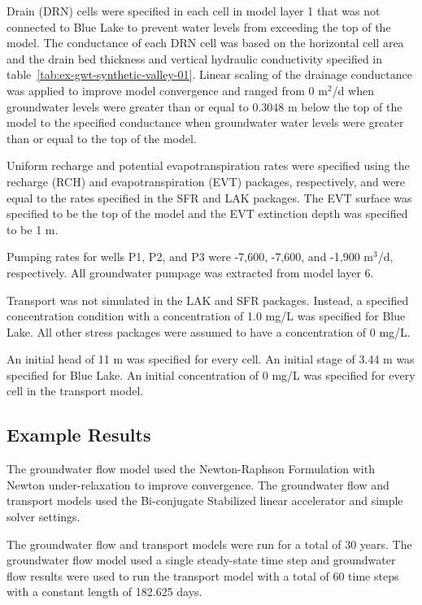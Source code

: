Drain (DRN) cells were specified in each cell in model layer 1 that was not connected to Blue Lake to prevent water levels from exceeding the top of the model. The conductance of each DRN cell was based on the horizontal cell area and the drain bed thickness and vertical hydraulic conductivity specified in table~\ref{tab:ex-gwt-synthetic-valley-01}. Linear scaling of the drainage conductance was applied to improve model convergence and ranged from 0 m$^2$/d when groundwater levels were greater than or equal to 0.3048 m below the top of the model to the specified conductance when groundwater water levels were greater than or equal to the top of the model.

Uniform recharge and potential evapotranspiration rates were specified using the recharge (RCH) and evapotranspiration (EVT) packages, respectively, and were equal to the rates specified in the SFR and LAK packages. The EVT surface was specified to be the top of the model and the EVT extinction depth was specified to be 1 m.

Pumping rates for wells P1, P2, and P3 were -7,600, -7,600, and -1,900 m$^3$/d, respectively. All groundwater pumpage was extracted from model layer 6.

Transport was not simulated in the LAK and SFR packages. Instead, a specified concentration condition with a concentration of 1.0 mg/L was specified for Blue Lake. All other stress packages were assumed to have a concentration of 0 mg/L.

An initial head of 11 m was specified for every cell. An initial stage of 3.44 m was specified for Blue Lake. An initial concentration of 0 mg/L was specified for every cell in the transport model.


\subsection{Example Results}

The groundwater flow model used the Newton-Raphson Formulation with Newton under-relaxation to improve convergence. The groundwater flow and transport models used the Bi-conjugate Stabilized linear accelerator and simple solver settings.
 
The groundwater flow and transport models were run for a total of 30 years. The groundwater flow model used a single steady-state time step and groundwater flow results were used to run the transport model with a total of 60 time steps with a constant length of 182.625 days.
 
